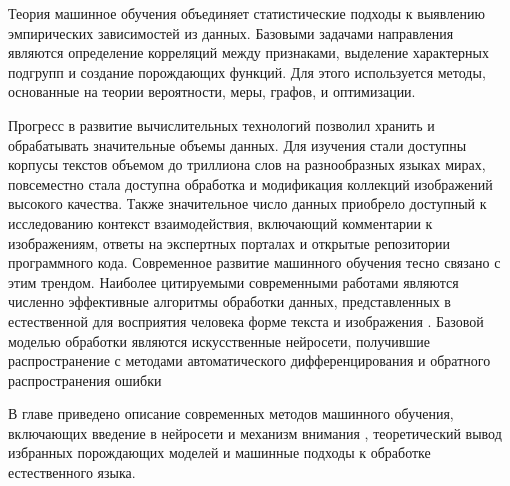 Теория машинное обучения объединяет статистические подходы к выявлению
эмпирических зависимостей из данных. Базовыми задачами направления являются определение корреляций между признаками,
выделение характерных подгрупп и создание порождающих функций. Для этого используется методы, основанные на 
теории вероятности, меры, графов, и оптимизации. 

Прогресс в развитие вычислительных технологий позволил хранить и обрабатывать значительные объемы данных. Для изучения
стали доступны корпусы текстов объемом до триллиона слов на разнообразных языках мирах, повсеместно стала доступна 
обработка и модификация коллекций изображений высокого качества. Также значительное число данных приобрело доступный 
к исследованию контекст взаимодействия, включающий комментарии к изображениям, ответы на экспертных порталах и открытые репозитории
программного кода. Современное развитие машинного обучения тесно связано с этим трендом. Наиболее цитируемыми современными работами
являются численно эффективные алгоритмы обработки данных, представленных в естественной для восприятия человека форме 
текста \cite{vaswani2017attention} \cite{radford2019language} и изображения \cite{kingma2013aut} \cite{song2020score}. Базовой
моделью обработки являются искусственные нейросети, получившие распространение с методами автоматического дифференцирования 
\cite{paszke2017automatic}\cite{baydin2018automatic}
и обратного распространения ошибки \cite{rumelhart1986learning}

В главе приведено описание современных методов машинного обучения, включающих введение в нейросети и механизм внимания
\cite{vaswani2017attention}, теоретический вывод избранных порождающих моделей и машинные подходы к обработке естественного языка.

